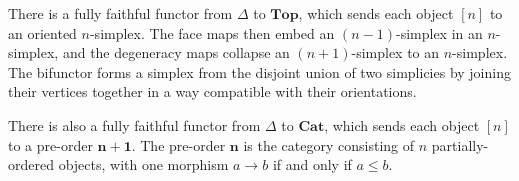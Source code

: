 \documentclass[12pt]{article}
\newcommand*{\mathcat}[1]{\mathord{\mathbf{#1}}}
\theoremstyle{inlinedefn}
\theoremstyle{break}
\begin{document}
There is a fully faithful functor from $\Delta$ to $\mathcat{Top}$,
which sends each object $[n]$ to an oriented $n$-simplex.
The face maps then embed an $(n-1)$-simplex in an $n$-simplex, and the degeneracy maps collapse an $(n+1)$-simplex to an $n$-simplex.
The bifunctor forms a simplex from the disjoint union of two simplicies by joining their vertices together in a way compatible with their orientations.

There is also a fully faithful functor from $\Delta$ to $\mathcat{Cat}$,
which sends each object $[n]$ to a pre-order $\mathcat{n+1}$.
The pre-order $\mathcat{n}$ is the category consisting of $n$ partially-ordered objects, with one morphism $a \to b$ if and only if $a \leq b$.
\end{document}
